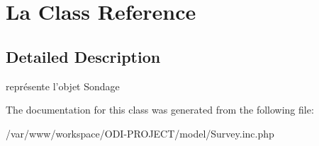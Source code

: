 \section{La Class Reference}
\label{class_la}


\subsection{Detailed Description}
représente l'objet Sondage 

The documentation for this class was generated from the following file\+:\begin{DoxyCompactItemize}
\item 
/var/www/workspace/\+O\+D\+I-\/\+P\+R\+O\+J\+E\+C\+T/model/Survey.\+inc.\+php\end{DoxyCompactItemize}
